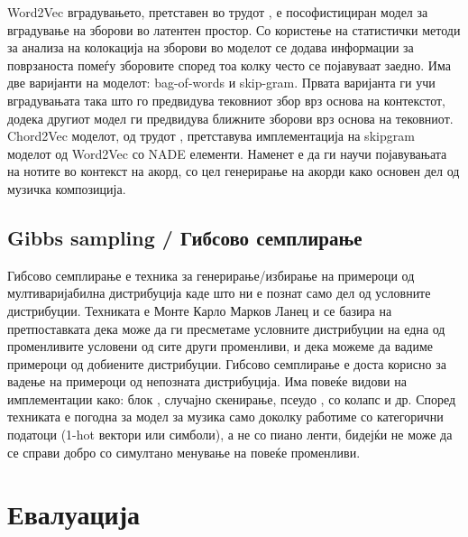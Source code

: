 Word2Vec вградувањето, претставен во трудот \cite{Mikolov2013}, е пософистициран модел за вградување на зборови во латентен простор. Со користење на статистички методи за анализа на колокација на зборови во моделот се додава информации за поврзаноста помеѓу зборовите според тоа колку често се појавуваат заедно. Има две варијанти на моделот: bag-of-words и skip-gram. Првата варијанта ги учи вградувањата така што го предвидува тековниот збор врз основа на контекстот, додека другиот модел ги предвидува ближните зборови врз основа на тековниот. 
Chord2Vec моделот, од трудот \cite{Madjiheurem2016}, претставува имплементација на skipgram моделот од Word2Vec со NADE елементи. Наменет е да ги научи појавувањата на нотите во контекст на акорд, со цел генерирање на акорди како основен дел од музичка композиција. 

\section{Gibbs sampling / Гибсово семплирање}

Гибсово семплирање е техника за генерирање/избирање на примероци од мултиваријабилна дистрибуција каде што ни е познат само дел од условните дистрибуции. Техниката е Монте Карло Марков Ланец и се базира на претпоставката дека може да ги пресметаме условните дистрибуции на една од променливите условени од сите други променливи, и дека можеме да вадиме примероци од добиените дистрибуции. Гибсово семплирање е доста корисно за вадење на примероци од непозната дистрибуција. Има повеќе видови на имплементации како: блок \cite{Boulanger-Lewandowski2012, Goel2014}, случајно скенирање, псеудо \cite{Hadjeres2016}, со колапс и др. Според \cite{Hadjeres2016} техниката е погодна за модел за музика само доколку работиме со категорични податоци (1-hot вектори или симболи), а не со пиано ленти, бидејќи не може да се справи добро со симултано менување на повеќе променливи.

\chapter{Евалуација}
\label{ch:evaluacija}


